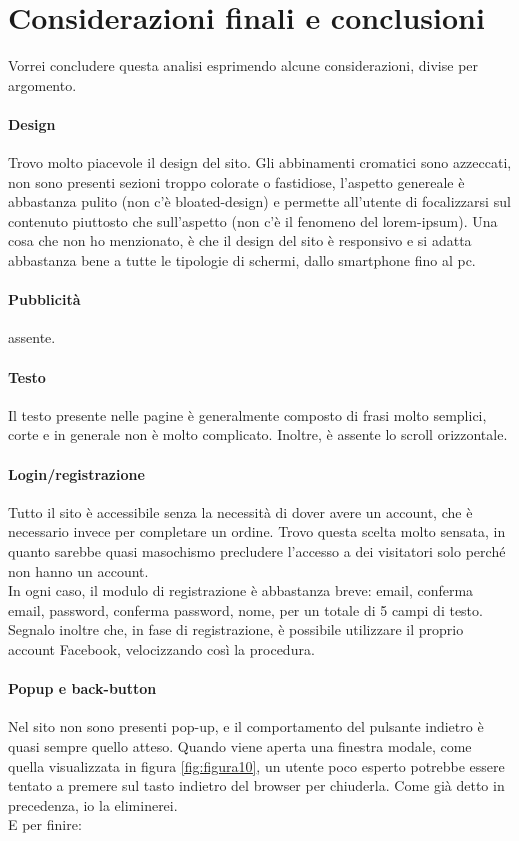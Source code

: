 \section{Considerazioni finali e conclusioni}
Vorrei concludere questa analisi esprimendo alcune considerazioni, divise per argomento.
\paragraph{Design} Trovo molto piacevole il design del sito. Gli abbinamenti cromatici sono azzeccati, non sono presenti sezioni troppo colorate o fastidiose, l'aspetto genereale è abbastanza pulito (non c'è bloated-design) e permette all'utente di focalizzarsi sul contenuto piuttosto che sull'aspetto (non c'è il fenomeno del lorem-ipsum). Una cosa che non ho menzionato, è che il design del sito è responsivo e si adatta abbastanza bene a tutte le tipologie di schermi, dallo smartphone fino al pc.
\paragraph{Pubblicità} assente.
\paragraph{Testo} Il testo presente nelle pagine è generalmente composto di frasi molto semplici, corte e in generale non è molto complicato. Inoltre, è assente lo scroll orizzontale.
\paragraph{Login/registrazione} Tutto il sito è accessibile senza la necessità di dover avere un account, che è necessario invece per completare un ordine. Trovo questa scelta molto sensata, in quanto sarebbe quasi masochismo precludere l'accesso a dei visitatori solo perché non hanno un account.\\In ogni caso, il modulo di registrazione è abbastanza breve: email, conferma email, password, conferma password, nome, per un totale di 5 campi di testo. Segnalo inoltre che, in fase di registrazione, è possibile utilizzare il proprio account Facebook, velocizzando così la procedura. 
\paragraph{Popup e back-button} Nel sito non sono presenti pop-up, e il comportamento del pulsante indietro è quasi sempre quello atteso. Quando viene aperta una finestra modale, come quella visualizzata in figura \ref{fig:figura10}, un utente poco esperto potrebbe essere tentato a premere sul tasto indietro del browser per chiuderla. Come già detto in precedenza, io la eliminerei.\\
E per finire:
